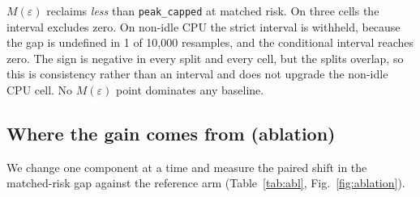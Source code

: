 \documentclass[conference]{IEEEtran}
\newcommand{\Meps}{$M(\varepsilon)$}
\begin{document}
\Meps{} reclaims \emph{less} than \texttt{peak\_capped} at matched risk. On three cells the interval excludes zero. On non-idle CPU the strict interval is withheld, because the gap is undefined in 1 of 10,000 resamples, and the conditional interval reaches zero. The sign is negative in every split and every cell, but the splits overlap, so this is consistency rather than an interval and does not upgrade the non-idle CPU cell. No \Meps{} point dominates any baseline.

\subsection{Where the gain comes from (ablation)}
\label{sec:ablation}
We change one component at a time and measure the paired shift in the matched-risk gap against the reference arm (Table~\ref{tab:abl}, Fig.~\ref{fig:ablation}).

\begin{table}[t]
\caption{Paired shift in the matched-risk gap against the reference arm, in percentage points; positive means the change helped. Brackets are 95\% bootstrap CIs; \emph{c} marks a conditional interval, with the undefined share in parentheses where it is large; bold intervals exclude zero.}
\label{tab:abl}
\centering
\footnotesize
{}
\end{table}
\end{document}
